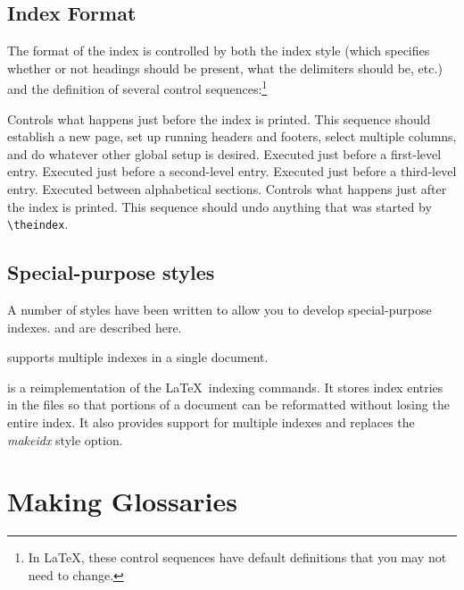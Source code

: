 \subsection{Index Format}
\label{sec:indexeslooklike}

The format of the index is controlled by both the index style (which
specifies whether or not headings should be present, what the delimiters
should be, etc.) and the definition of several control sequences:\footnote{In
\LaTeX, these control sequences have default definitions that you may not
need to change.}

\begin{iplist}[\textnormal]{.25in}
   Controls what happens just before the index
    is printed.  This sequence should establish a new page, set up 
    running headers and footers, select multiple columns, and do whatever
    other global setup is desired.
   Executed just before a first-level entry.
   Executed just before a second-level entry.
   Executed just before a third-level entry.
   Executed between alphabetical sections.
   Controls what happens just after the index
   is printed.  This sequence should undo anything that was started by
   \verb|\theindex|.
\end{iplist}

\subsection{Special-purpose styles}

A number of styles
have been written 
to allow you to develop special-purpose
indexes.   and  are described here.

 supports multiple indexes in a single document.

 is a reimplementation of the \LaTeX\ indexing
  commands.  It
  stores index entries in the  files so that portions of 
  a document can be reformatted without losing the entire index.
  It also provides support for multiple indexes and replaces the
  \textit{makeidx} style option.

\section{Making Glossaries} 

